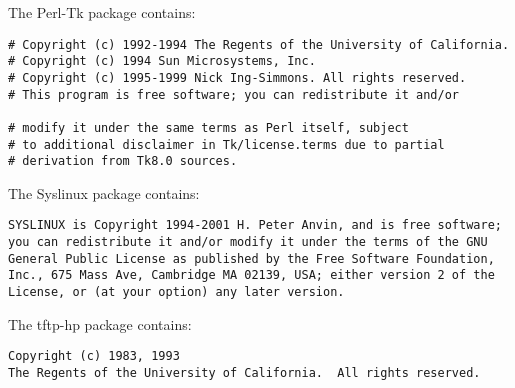The Perl-Tk package contains:

\begin{verbatim}
# Copyright (c) 1992-1994 The Regents of the University of California.
# Copyright (c) 1994 Sun Microsystems, Inc.
# Copyright (c) 1995-1999 Nick Ing-Simmons. All rights reserved.
# This program is free software; you can redistribute it and/or

# modify it under the same terms as Perl itself, subject
# to additional disclaimer in Tk/license.terms due to partial
# derivation from Tk8.0 sources.
\end{verbatim}

The Syslinux package contains:

\begin{verbatim}
SYSLINUX is Copyright 1994-2001 H. Peter Anvin, and is free software;
you can redistribute it and/or modify it under the terms of the GNU
General Public License as published by the Free Software Foundation,
Inc., 675 Mass Ave, Cambridge MA 02139, USA; either version 2 of the
License, or (at your option) any later version.
\end{verbatim}

The tftp-hp package contains:

\begin{verbatim}
Copyright (c) 1983, 1993
The Regents of the University of California.  All rights reserved.
\end{verbatim}


